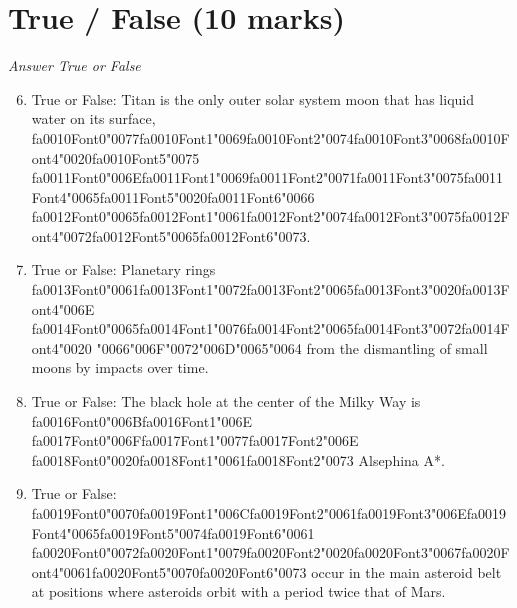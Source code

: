 \documentclass[12pt]{article}
\begin{document}
\section*{True / False (10 marks)}
\textit{Answer True or False}
\begin{enumerate}[label=\arabic*.]
\setcounter{enumi}{5}
\item True or False: Titan is the only outer solar system moon that has liquid water on its surface, {\csname fa0010Font0\endcsname\char"0077}{\csname fa0010Font1\endcsname\char"0069}{\csname fa0010Font2\endcsname\char"0074}{\csname fa0010Font3\endcsname\char"0068}{\csname fa0010Font4\endcsname\char"0020}{\csname fa0010Font5\endcsname\char"0075} {\csname fa0011Font0\endcsname\char"006E}{\csname fa0011Font1\endcsname\char"0069}{\csname fa0011Font2\endcsname\char"0071}{\csname fa0011Font3\endcsname\char"0075}{\csname fa0011Font4\endcsname\char"0065}{\csname fa0011Font5\endcsname\char"0020}{\csname fa0011Font6\endcsname\char"0066} {\csname fa0012Font0\endcsname\char"0065}{\csname fa0012Font1\endcsname\char"0061}{\csname fa0012Font2\endcsname\char"0074}{\csname fa0012Font3\endcsname\char"0075}{\csname fa0012Font4\endcsname\char"0072}{\csname fa0012Font5\endcsname\char"0065}{\csname fa0012Font6\endcsname\char"0073}.
\item True or False: Planetary rings {\csname fa0013Font0\endcsname\char"0061}{\csname fa0013Font1\endcsname\char"0072}{\csname fa0013Font2\endcsname\char"0065}{\csname fa0013Font3\endcsname\char"0020}{\csname fa0013Font4\endcsname\char"006E} {\csname fa0014Font0\endcsname\char"0065}{\csname fa0014Font1\endcsname\char"0076}{\csname fa0014Font2\endcsname\char"0065}{\csname fa0014Font3\endcsname\char"0072}{\csname fa0014Font4\endcsname\char"0020} {\char"0066}{\char"006F}{\char"0072}{\char"006D}{\char"0065}{\char"0064} from the dismantling of small moons by impacts over time.
\item True or False: The black hole at the center of the Milky Way is {\csname fa0016Font0\endcsname\char"006B}{\csname fa0016Font1\endcsname\char"006E} {\csname fa0017Font0\endcsname\char"006F}{\csname fa0017Font1\endcsname\char"0077}{\csname fa0017Font2\endcsname\char"006E} {\csname fa0018Font0\endcsname\char"0020}{\csname fa0018Font1\endcsname\char"0061}{\csname fa0018Font2\endcsname\char"0073} Alsephina A*.
\item True or False: {\csname fa0019Font0\endcsname\char"0070}{\csname fa0019Font1\endcsname\char"006C}{\csname fa0019Font2\endcsname\char"0061}{\csname fa0019Font3\endcsname\char"006E}{\csname fa0019Font4\endcsname\char"0065}{\csname fa0019Font5\endcsname\char"0074}{\csname fa0019Font6\endcsname\char"0061} {\csname fa0020Font0\endcsname\char"0072}{\csname fa0020Font1\endcsname\char"0079}{\csname fa0020Font2\endcsname\char"0020}{\csname fa0020Font3\endcsname\char"0067}{\csname fa0020Font4\endcsname\char"0061}{\csname fa0020Font5\endcsname\char"0070}{\csname fa0020Font6\endcsname\char"0073} occur in the main asteroid belt at positions where asteroids orbit with a period twice that of Mars.

\end{enumerate}
\end{document}
